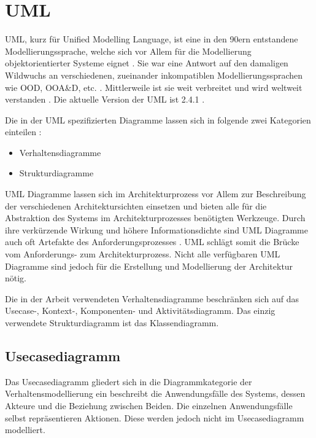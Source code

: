 \section{UML}
UML, kurz für Unified Modelling Language, ist eine in den 90ern entstandene Modellierungssprache, welche sich vor Allem für die Modellierung objektorientierter Systeme eignet \cite[S. 145]{basiswissen}. Sie war eine Antwort auf den damaligen Wildwuchs an verschiedenen, zueinander inkompatiblen Modellierungssprachen wie OOD, OOA\&D, etc. \cite[S. 5]{glasklar}. Mittlerweile ist sie weit verbreitet und wird weltweit verstanden \cite[S. 138]{effektiv}. Die aktuelle Version der UML ist 2.4.1 \cite{omg}.


Die in der UML spezifizierten Diagramme lassen sich in folgende zwei Kategorien einteilen \cite[S. 105, 239]{glasklar}\cite[S. 146]{basiswissen}:

\begin{itemize}
  \item Verhaltensdiagramme
  \item Strukturdiagramme
\end{itemize}

UML Diagramme lassen sich im Architekturprozess vor Allem zur Beschreibung der verschiedenen Architektursichten einsetzen und bieten alle für die Abstraktion des Systems im Architekturprozesses benötigten Werkzeuge\cite[S. 139]{effektiv}. Durch ihre verkürzende Wirkung und höhere Informationsdichte sind UML Diagramme auch oft Artefakte des Anforderungsprozesses \cite[S. 215]{reqman}. UML schlägt somit die Brücke vom Anforderungs- zum Architekturprozess. Nicht alle verfügbaren UML Diagramme sind jedoch für die Erstellung und Modellierung der Architektur nötig. \cite[S. 144]{basiswissen}

Die in der Arbeit verwendeten Verhaltensdiagramme beschränken sich auf das Usecase-, Kontext-, Komponenten- und Aktivitätsdiagramm. Das einzig verwendete Strukturdiagramm ist das Klassendiagramm.


\subsection{Usecasediagramm}
Das Usecasediagramm gliedert sich in die Diagrammkategorie der Verhaltensmodellierung ein beschreibt die Anwendungsfälle des Systems, dessen Akteure und die Beziehung zwischen Beiden. Die einzelnen Anwendungsfälle selbst repräsentieren Aktionen. Diese werden jedoch nicht im Usecasediagramm modelliert.\cite[S. 242-245]{glasklar}

